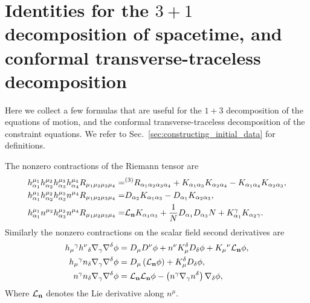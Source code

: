 \documentclass{ws-ijmpd}
\begin{document}
\section{Identities for the $3+1$ decomposition of spacetime, and 
conformal transverse-traceless decomposition
   \label{sec:spatial_conformal_decomposition}
}
Here we collect a few formulas that are useful for the $1+3$ decomposition
of the equations of motion, and the conformal transverse-traceless
decomposition of the constraint equations.
We refer to Sec.~\ref{sec:constructing_initial_data} for definitions.

The nonzero contractions of the Riemann tensor 
are\cite{Cook:2000vr,baumgarte2010numerical,Gourgoulhon:2007ue}
\begin{subequations}
\begin{align}
   h_{\alpha_1}^{\mu_1}
   h_{\alpha_2}^{\mu_2}
   h_{\alpha_3}^{\mu_3}
   h_{\alpha_4}^{\mu_4}
   R_{\mu_1\mu_2\mu_3\mu_4}
   =&
   {}^{(3)}R_{\alpha_1\alpha_2\alpha_3\alpha_4}
   +
   K_{\alpha_1\alpha_3}K_{\alpha_2\alpha_4}
   -
   K_{\alpha_1\alpha_4}K_{\alpha_2\alpha_3}
   ,\\
   h_{\alpha_1}^{\mu_1}
   h_{\alpha_2}^{\mu_2}
   h_{\alpha_3}^{\mu_3}
   n^{\mu_4}
   R_{\mu_1\mu_2\mu_3\mu_4}
   =&
   D_{\alpha_2}K_{\alpha_1\alpha_3}
   -
   D_{\alpha_1}K_{\alpha_2\alpha_3}
   ,\\
   h_{\alpha_1}^{\mu_1}
   n^{\mu_2}
   h_{\alpha_3}^{\mu_3}
   n^{\mu_4}
   R_{\mu_1\mu_2\mu_3\mu_4}
   =&
   \mathcal{L}_{\bf n}K_{\alpha_1\alpha_3}
   +
   \frac{1}{N}D_{\alpha_1}D_{\alpha_3}N
   +
   K_{\alpha_1}^{\gamma}K_{\alpha_2\gamma}
   .
\end{align}
\end{subequations}
Similarly the nonzero contractions on the scalar field second derivatives are 
\begin{align}
   h_{\mu}{}^{\gamma}h^{\nu}{}_{\delta}\nabla_{\gamma}\nabla^{\delta}\phi
   &=
   D_{\mu}D^{\nu}\phi
   +
   n^{\nu}K_{\mu}^{\delta}D_{\delta}\phi
   +
   K_{\mu}{}^{\nu}\mathcal{L}_{\bf n}\phi
   ,\\
   h_{\mu}{}^{\gamma}n_{\delta}\nabla_{\gamma}\nabla^{\delta}\phi
   &=
   D_{\mu}\left(\mathcal{L}_{\bf n}\phi\right)
   +
   K_{\mu}^{\delta}D_{\delta}\phi
   ,\\
   n^{\gamma}n_{\delta}\nabla_{\gamma}\nabla^{\delta}\phi
   &=
   \mathcal{L}_{\bf n}\mathcal{L}_{\bf n}\phi
   -
   \left(n^{\gamma}\nabla_{\gamma}n^{\delta}\right)\nabla_{\delta}\phi
   ,
\end{align}
Where $\mathcal{L}_{\bf n}$ denotes the Lie derivative along $n^{\mu}$.
\end{document}
